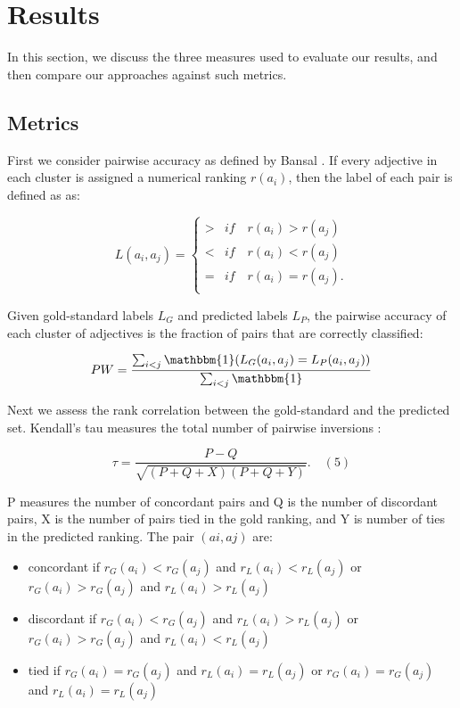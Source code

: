 
\section{Results}

In this section, we discuss the three measures used to evaluate our results, and then compare our approaches against such metrics. 

\subsection{Metrics}

First we consider pairwise accuracy as defined by Bansal . If every adjective in each cluster is assigned a numerical ranking $r(a_i)$, then the label of each pair is defined as as: 

\[
  L(a_i, a_j) = \begin{cases}
  > & if \quad r(a_i) > r(a_j)\\
  < & if \quad r(a_i) < r(a_j)\\
  = & if \quad r(a_i) = r(a_j).\\
  \end{cases}
\]

Given gold-standard labels $L_G$ and predicted labels $L_P$, the pairwise accuracy of each cluster of adjectives is the fraction of pairs that are correctly classified:

\[
PW = \frac{ \sum_{i < j} \mathbbm{1}( L_G(a_i,a_j) = L_P(a_i,a_j) )  }{\sum_{i<j} \mathbbm{1} }
\]

Next we assess the rank correlation between the gold-standard and the predicted set. Kendall's tau measures the total number of pairwise inversions :

\[
\tau = \frac{ P - Q }{\sqrt{  (P + Q + X)(P + Q + Y) }  }. \quad (5)
\]


P measures the number of concordant pairs and Q is the number of discordant pairs, X is the number of pairs tied in the gold ranking, and Y is number of ties in the predicted ranking. The pair $(ai,aj)$ are:

\begin{itemize}
\item concordant if $r_G(a_i) < r_G(a_j)$ and $r_L(a_i) < r_L(a_j)$ or $r_G(a_i)> r_G(a_j)$ and $r_L(a_i) > r_L(a_j)$
\item discordant if $r_G(a_i) < r_G(a_j)$ and $r_L(a_i) > r_L(a_j)$ or $r_G(a_i) > r_G(a_j)$ and $r_L(a_i) < r_L(a_j)$
\item tied if $r_G(a_i) = r_G(a_j)$ and $r_L(a_i) = r_L(a_j)$ or $r_G(a_i) = r_G(a_j)$ and $r_L(a_i) = r_L(a_j)$
\end{itemize}

